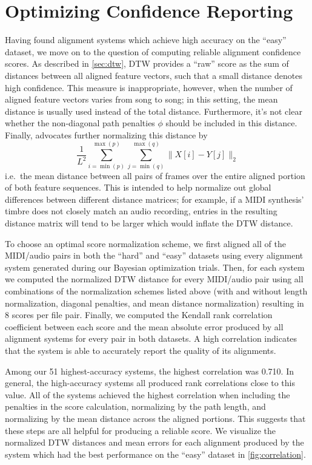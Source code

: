 \section{Optimizing Confidence Reporting}
\label{sec:confidence}

Having found alignment systems which achieve high accuracy on the ``easy'' dataset, we move on to the question of computing reliable alignment confidence scores.
As described in \cref{sec:dtw}, DTW provides a ``raw'' score as the sum of distances between all aligned feature vectors, such that a small distance denotes high confidence.
This measure is inappropriate, however, when the number of aligned feature vectors varies from song to song; in this setting, the mean distance is usually used instead of the total distance.
Furthermore, it's not clear whether the non-diagonal path penalties $\phi$ should be included in this distance.
Finally, \cite{raffel2015large} advocates further normalizing this distance by
\begin{equation}
\frac{1}{L^2} \sum_{i = \min(p)}^{\max(p)} \sum_{j = \min(q)}^{\max(q)} \|X[i] - Y[j]\|_2
\label{eq:dtw_mean_distance_normalization}
\end{equation}
i.e.\ the mean distance between all pairs of frames over the entire aligned portion of both feature sequences.
This is intended to help normalize out global differences between different distance matrices; for example, if a MIDI synthesis' timbre does not closely match an audio recording, entries in the resulting distance matrix will tend to be larger which would inflate the DTW distance.

To choose an optimal score normalization scheme, we first aligned all of the MIDI/audio pairs in both the ``hard'' and ``easy'' datasets using every alignment system generated during our Bayesian optimization trials.
Then, for each system we computed the normalized DTW distance for every MIDI/audio pair using all combinations of the normalization schemes listed above (with and without length normalization, diagonal penalties, and mean distance normalization) resulting in 8 scores per file pair.
Finally, we computed the Kendall rank correlation coefficient \cite{kendall1938new} between each score and the mean absolute error produced by all alignment systems for every pair in both datasets.
A high correlation indicates that the system is able to accurately report the quality of its alignments.

Among our 51 highest-accuracy systems, the highest correlation was 0.710.
In general, the high-accuracy systems all produced rank correlations close to this value.
All of the systems achieved the highest correlation when including the penalties in the score calculation, normalizing by the path length, and normalizing by the mean distance across the aligned portions.
This suggests that these steps are all helpful for producing a reliable score.
We visualize the normalized DTW distances and mean errors for each alignment produced by the system which had the best performance on the ``easy'' dataset in \cref{fig:correlation}.

